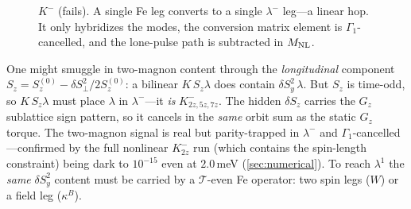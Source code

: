 \documentclass[11pt,a4paper]{article}
\begin{document}
\begin{figure}[h]
\centering
{}
\caption{$K^-$ (fails).  A single Fe leg converts to a single $\lambda^-$ leg---a
linear hop.  It only hybridizes the modes, the conversion matrix element is
$\Gamma_1$-cancelled, and the lone-pulse path is subtracted in $M_{\rm NL}$.}
\label{fig:vx-kminus}
\end{figure}

\begin{keybox}[title={The longitudinal temptation, and why it is still trapped}]
One might smuggle in two-magnon content through the \emph{longitudinal}
component $S_z=S_z^{(0)}-\delta S_\perp^2/2S_z^{(0)}$: a bilinear $K\,S_z\lambda$
does contain $\delta S_y^2\,\lambda$.  But $S_z$ is time-odd, so $K\,S_z\lambda$
must place $\lambda$ in $\lambda^-$---it \emph{is} $K^-_{2z,5z,7z}$.  The hidden
$\delta S_z$ carries the $G_z$ sublattice sign pattern, so it cancels in the
\emph{same} orbit sum as the static $G_z$ torque.  The two-magnon signal is real
but parity-trapped in $\lambda^-$ and $\Gamma_1$-cancelled---confirmed by the
full nonlinear $K^-_{2z}$ run (which contains the spin-length constraint) being
dark to $10^{-15}$ even at $2.0\,$meV (\cref{sec:numerical}).  To reach
$\lambda^1$ the \emph{same} $\delta S_y^2$ content must be carried by a
$\mathcal T$-even Fe operator: two spin legs ($W$) or a field leg ($\kappa^B$).
\end{keybox}
\end{document}
